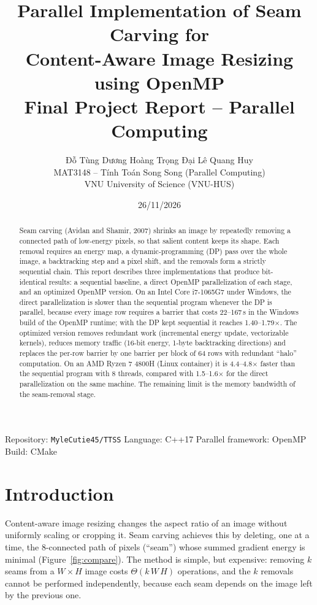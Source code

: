 \documentclass[11pt,a4paper]{article}
\title{\textbf{Parallel Implementation of Seam Carving for\\Content-Aware Image Resizing using OpenMP}\\[6pt]
\large Final Project Report -- Parallel Computing}
\author{Đỗ Tùng Dương \quad Hoàng Trọng Đại \quad Lê Quang Huy\\[2pt]
\small MAT3148 -- Tính Toán Song Song (Parallel Computing)\\
\small VNU University of Science (VNU-HUS)}
\date{26/11/2026}
\newcommand{\x}{\ensuremath{\times}}
\newcommand{\us}{\,\textmu s}
\begin{document}
\maketitle

\begin{center}
\small Repository: \texttt{MyleCutie45/TTSS} \quad Language: C++17 \quad Parallel framework: OpenMP \quad Build: CMake
\end{center}

\begin{abstract}
Seam carving (Avidan and Shamir, 2007) shrinks an image by repeatedly removing a connected path of
low-energy pixels, so that salient content keeps its shape. Each removal requires an energy map, a
dynamic-programming (DP) pass over the whole image, a backtracking step and a pixel shift, and the
removals form a strictly sequential chain. This report describes three implementations that produce
bit-identical results: a sequential baseline, a direct OpenMP parallelization of each stage, and an
optimized OpenMP version. On an Intel Core i7-1065G7 under Windows, the direct parallelization is slower
than the sequential program whenever the DP is parallel, because every image row requires a barrier that
costs 22--167\us{} in the Windows build of the OpenMP runtime; with the DP kept sequential it reaches
1.40--1.79\x. The optimized version removes redundant work (incremental energy update, vectorizable
kernels), reduces memory traffic (16-bit energy, 1-byte backtracking directions) and replaces the per-row
barrier by one barrier per block of 64 rows with redundant ``halo'' computation. On an AMD Ryzen 7 4800H
(Linux container) it is 4.4--4.8\x{} faster than the sequential program with 8 threads, compared with
1.5--1.6\x{} for the direct parallelization on the same machine. The remaining limit is the memory
bandwidth of the seam-removal stage.
\end{abstract}

\tableofcontents
\newpage

\section{Introduction}

Content-aware image resizing changes the aspect ratio of an image without uniformly scaling or cropping
it. Seam carving achieves this by deleting, one at a time, the 8-connected path of pixels (``seam'') whose
summed gradient energy is minimal (Figure~\ref{fig:compare}). The method is simple, but expensive: removing
$k$ seams from a $W\times H$ image costs $\Theta(k\,W\,H)$ operations, and the $k$ removals cannot be
performed independently, because each seam depends on the image left by the previous one.
\end{document}
